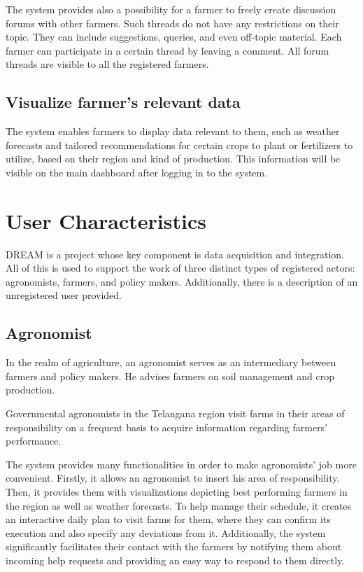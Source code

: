 The system provides also a possibility for a farmer to freely create discussion forums with other farmers. Such threads do not have any restrictions on their topic. They can include suggestions, queries, and even off-topic material. Each farmer can participate in a certain thread by leaving a comment. All forum threads are visible to all the registered farmers.

\subsection{Visualize farmer's relevant data}

The system enables farmers to display data relevant to them, such as weather forecasts and tailored recommendations for certain crops to plant or fertilizers to utilize, based on their region and kind of production. This information will be visible on the main dashboard after logging in to the system.

\section{User Characteristics} \label{sec:user_characteristics}

DREAM is a project whose key component is data acquisition and integration. All of this is used to support the work of three distinct types of registered actors: agronomists, farmers, and policy makers. Additionally, there is a description of an unregistered user provided.

\subsection{Agronomist} \label{subsec:agronomist}

In the realm of agriculture, an agronomist serves as an intermediary between farmers and policy makers. He advises farmers on soil management and crop production.

Governmental agronomists in the Telangana region visit farms in their areas of responsibility on a frequent basis to acquire information regarding farmers' performance.

The system provides many functionalities in order to make agronomists' job more convenient. Firstly, it allows an agronomist to insert his area of responsibility. Then, it provides them with visualizations depicting best performing farmers in the region as well as weather forecasts. To help manage their schedule, it creates an interactive daily plan to visit farms for them, where they can confirm its execution and also specify any deviations from it. Additionally, the system significantly facilitates their contact with the farmers by notifying them about incoming help requests and providing an easy way to respond to them directly.

